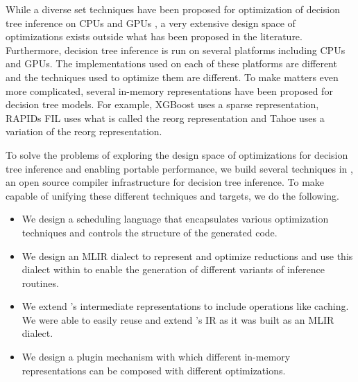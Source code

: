 While a diverse set techniques have been proposed for optimization of decision tree 
inference on CPUs and GPUs \cite{VPred, Tahoe, Treelite, XGBoost, Hummingbird, QuickScorer, FIL},
a very extensive design space of optimizations exists 
outside what has been proposed in the literature. Furthermore, decision tree inference 
is run on several platforms including CPUs and GPUs. The implementations used on each of 
these platforms are different and the techniques used to optimize them are different.
To make matters even more complicated, several in-memory representations
have been proposed for decision tree models. For example, XGBoost\cite{XGBoost} uses a sparse representation,
RAPIDs FIL\cite{FIL} uses what is called the reorg representation and Tahoe uses a variation of the reorg
representation. 

To solve the problems of exploring the design space of optimizations for decision tree
inference and enabling portable performance, we build several techniques in \Treebeard{}, 
an open source compiler infrastructure for decision tree inference. To make \Treebeard{}
capable of unifying these different techniques and targets, we do the following. 
\begin{itemize}
  \item We design a scheduling language that encapsulates various optimization techniques
  and controls the structure of the generated code.
  \item We design an MLIR dialect to represent and optimize reductions and use this 
  dialect within \Treebeard{} to enable the generation of different variants of 
  inference routines.
  \item We extend \Treebeard{}'s intermediate representations to include operations like caching.
  We were able to easily reuse and extend \Treebeard{}'s IR as it was built as an MLIR dialect.
  \item We design a plugin mechanism with which different in-memory representations
  can be composed with different optimizations.  
\end{itemize}